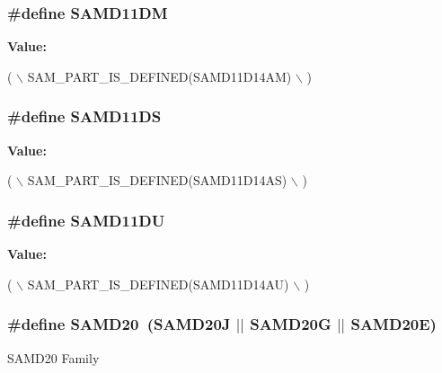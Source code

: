 \subsubsection[{S\+A\+M\+D11\+D\+M}]{\setlength{\rightskip}{0pt plus 5cm}\#define S\+A\+M\+D11\+D\+M}\label{group__sam__part__macros__group_gaa3d39f43fd1dfb13a8e3769dadd3a3b2}
{\bfseries Value\+:}
\begin{DoxyCode}
( \(\backslash\)
        SAM\_PART\_IS\_DEFINED(SAMD11D14AM) \(\backslash\)
    )
\end{DoxyCode}
\hypertarget{group__sam__part__macros__group_ga5a5c9017efa9764ece7e1e7fee1f5866}{}
\subsubsection[{S\+A\+M\+D11\+D\+S}]{\setlength{\rightskip}{0pt plus 5cm}\#define S\+A\+M\+D11\+D\+S}\label{group__sam__part__macros__group_ga5a5c9017efa9764ece7e1e7fee1f5866}
{\bfseries Value\+:}
\begin{DoxyCode}
( \(\backslash\)
        SAM\_PART\_IS\_DEFINED(SAMD11D14AS) \(\backslash\)
    )
\end{DoxyCode}
\hypertarget{group__sam__part__macros__group_gaf49d4f8c4df8247e3b09f8c5369589a5}{}
\subsubsection[{S\+A\+M\+D11\+D\+U}]{\setlength{\rightskip}{0pt plus 5cm}\#define S\+A\+M\+D11\+D\+U}\label{group__sam__part__macros__group_gaf49d4f8c4df8247e3b09f8c5369589a5}
{\bfseries Value\+:}
\begin{DoxyCode}
( \(\backslash\)
        SAM\_PART\_IS\_DEFINED(SAMD11D14AU) \(\backslash\)
    )
\end{DoxyCode}
\hypertarget{group__sam__part__macros__group_gad9193543e761f5967353a0464dde1e61}{}
\subsubsection[{S\+A\+M\+D20}]{\setlength{\rightskip}{0pt plus 5cm}\#define S\+A\+M\+D20~(S\+A\+M\+D20\+J $\vert$$\vert$ S\+A\+M\+D20\+G $\vert$$\vert$ S\+A\+M\+D20\+E)}\label{group__sam__part__macros__group_gad9193543e761f5967353a0464dde1e61}
S\+A\+M\+D20 Family \hypertarget{group__sam__part__macros__group_ga4540be1fa82a17932c6000a0919806b0}{}
